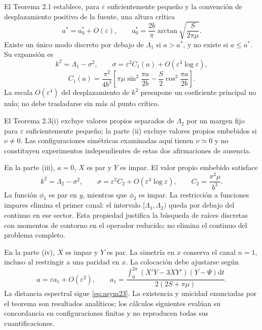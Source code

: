\documentclass[11pt]{article}
\newcommand{\eps}{\varepsilon}
\newcommand{\dd}{\mathrm{d}}
\begin{document}
El Teorema 2.1 establece, para $\eps$ suficientemente pequeño y la convención de desplazamiento positivo de la fuente, una altura crítica
\begin{equation}
 a^*=a_0^*+O(\eps),\qquad
 a_0^*=\frac{2b}{\pi}\arctan\sqrt{\frac{S}{2\pi\mu}}.\label{eq:critical}
\end{equation}
Existe un único modo discreto por debajo de $\Lambda_1$ si $a>a^*$, y no existe si $a\leq a^*$. Su expansión es
\begin{equation}
 k^2=\Lambda_1-\sigma^2,\qquad
 \sigma=\eps^2 C_1(a)+O(\eps^3\log\eps),\label{eq:asym21}
\end{equation}
\begin{equation}
 C_1(a)=\frac{\pi^2}{4b^3}
 \left[\pi\mu\sin^2\frac{\pi a}{2b}
       -\frac{S}{2}\cos^2\frac{\pi a}{2b}\right].
\end{equation}
La escala $O(\eps^4)$ del desplazamiento de $k^2$ presupone un coeficiente principal no nulo; no debe trasladarse sin más al punto crítico.

El Teorema 2.3(i) excluye valores propios separados de $\Lambda_2$ por un margen fijo para $\eps$ suficientemente pequeño; la parte (ii) excluye valores propios embebidos si $\nu\ne0$. Las configuraciones simétricas examinadas aquí tienen $\nu\simeq0$ y no constituyen experimentos independientes de estas dos afirmaciones de ausencia.

En la parte (iii), $a=0$, $X$ es par y $Y$ es impar. El valor propio embebido satisface
\begin{equation}
 k^2=\Lambda_2-\sigma^2,\qquad
 \sigma=\eps^2 C_2+O(\eps^3\log\eps),\qquad
 C_2=\frac{\pi^3\mu}{b^3}.\label{eq:asym23}
\end{equation}
La función $\phi_1$ es par en $y$, mientras que $\phi_2$ es impar. La restricción a funciones impares elimina el primer canal: el intervalo $[\Lambda_1,\Lambda_2)$ queda por debajo del continuo en ese sector. Esta propiedad justifica la búsqueda de raíces discretas con momentos de contorno en el operador reducido; no elimina el continuo del problema completo.

En la parte (iv), $X$ es impar y $Y$ es par. La simetría en $x$ conserva el canal $n=1$, incluso al restringir a una paridad en $x$. La colocación debe ajustarse según
\begin{equation}
 a=\eps a_1+O(\eps^2),\qquad
 a_1=\frac{\int_0^{2\pi}(X'Y-3XY')(Y-\Psi)\dd t}
 {2(2S+\pi\mu)}.\label{eq:a1}
\end{equation}
La distancia espectral sigue \eqref{eq:asym23}. La existencia y unicidad enunciadas por el teorema son resultados analíticos; los cálculos siguientes evalúan su concordancia en configuraciones finitas y no reproducen todas sus cuantificaciones.
\end{document}
